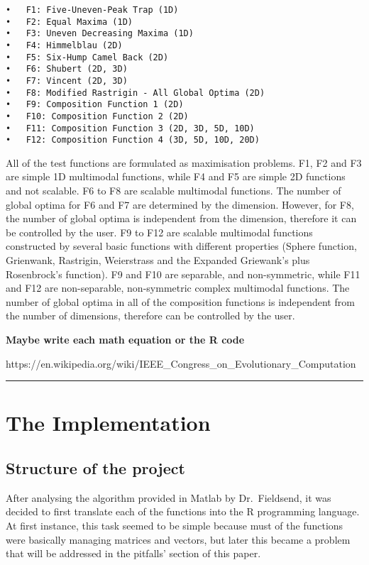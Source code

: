 \documentclass[12pt,a4paper]{article}
\begin{document}
\begin{verbatim}
•   F1: Five-Uneven-Peak Trap (1D)
•   F2: Equal Maxima (1D)
•   F3: Uneven Decreasing Maxima (1D)
•   F4: Himmelblau (2D)
•   F5: Six-Hump Camel Back (2D)
•   F6: Shubert (2D, 3D)
•   F7: Vincent (2D, 3D)
•   F8: Modified Rastrigin - All Global Optima (2D)
•   F9: Composition Function 1 (2D)
•   F10: Composition Function 2 (2D)
•   F11: Composition Function 3 (2D, 3D, 5D, 10D)
•   F12: Composition Function 4 (3D, 5D, 10D, 20D)
\end{verbatim}

All of the test functions are formulated as maximisation problems. F1,
F2 and F3 are simple 1D multimodal functions, while F4 and F5 are simple
2D functions and not scalable. F6 to F8 are scalable multimodal
functions. The number of global optima for F6 and F7 are determined by
the dimension. However, for F8, the number of global optima is
independent from the dimension, therefore it can be controlled by the
user. F9 to F12 are scalable multimodal functions constructed by several
basic functions with different properties (Sphere function, Grienwank,
Rastrigin, Weierstrass and the Expanded Griewank's plus Rosenbrock's
function). F9 and F10 are separable, and non-symmetric, while F11 and
F12 are non-separable, non-symmetric complex multimodal functions. The
number of global optima in all of the composition functions is
independent from the number of dimensions, therefore can be controlled
by the user.

\textbf{Maybe write each math equation or the R code}

https://en.wikipedia.org/wiki/IEEE\_Congress\_on\_Evolutionary\_Computation

\begin{center}\rule{0.5\linewidth}{\linethickness}\end{center}

\section{The Implementation}\label{the-implementation}

\subsection{Structure of the project}\label{structure-of-the-project}

After analysing the algorithm provided in Matlab by Dr.~Fieldsend, it
was decided to first translate each of the functions into the R
programming language. At first instance, this task seemed to be simple
because must of the functions were basically managing matrices and
vectors, but later this became a problem that will be addressed in the
pitfalls' section of this paper.
\end{document}
